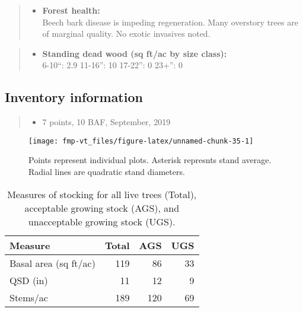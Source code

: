 \documentclass[]{tufte-handout}
\providecommand{\tightlist}{%
  \setlength{\itemsep}{0pt}\setlength{\parskip}{0pt}}
\begin{document}
\begin{quote}
\begin{itemize}
\tightlist
\item
  \textbf{Forest health:}\\
  \vspace{2pt} Beech bark disease is impeding regeneration. Many
  overstory trees are of marginal quality. No exotic invasives noted.
\end{itemize}
\end{quote}

\begin{quote}
\begin{itemize}
\tightlist
\item
  \textbf{Standing dead wood (sq ft/ac by size class):}\\
  \vspace{2pt} \indent \small 6-10``: 2.9 \textbar{} 11-16'': 10
  \textbar{} 17-22'': 0 \textbar{} 23+'': 0
\end{itemize}
\end{quote}

\subsection{Inventory information}\label{inventory-information-5}

\begin{quote}
\begin{itemize}
\tightlist
\item
  7 points, 10 BAF, September, 2019
\end{itemize}
\end{quote}

\begin{figure}
\texttt{[image: fmp-vt\_files/figure-latex/unnamed-chunk-35-1]} \caption[Points represent individual plots]{Points represent individual plots. Asterisk represnts stand average. Radial lines are quadratic stand diameters.}\label{fig:unnamed-chunk-35}
\end{figure}

\begin{table}

\caption{\label{tab:unnamed-chunk-36}Measures of stocking for all live trees (Total), acceptable growing stock (AGS), and unacceptable growing stock (UGS).}
\centering
\begin{tabular}[t]{lrrr}
\toprule
Measure & Total & AGS & UGS\\
\midrule
Basal area (sq ft/ac) & 119 & 86 & 33\\
QSD (in) & 11 & 12 & 9\\
Stems/ac & 189 & 120 & 69\\
\bottomrule
\end{tabular}
\end{table}
\end{document}

